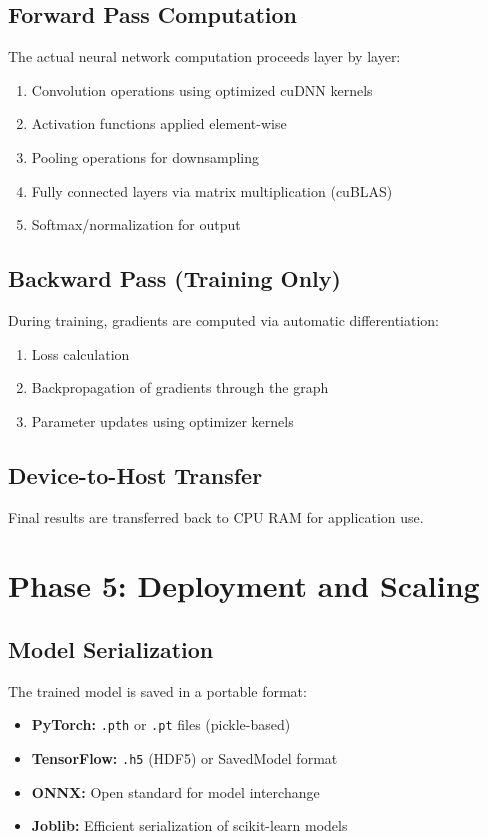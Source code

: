 \documentclass[11pt]{article}
\begin{document}
\subsection{Forward Pass Computation}
The actual neural network computation proceeds layer by layer:
\begin{enumerate}
    \item Convolution operations using optimized cuDNN kernels
    \item Activation functions applied element-wise
    \item Pooling operations for downsampling
    \item Fully connected layers via matrix multiplication (cuBLAS)
    \item Softmax/normalization for output
\end{enumerate}

\subsection{Backward Pass (Training Only)}
During training, gradients are computed via automatic differentiation:
\begin{enumerate}
    \item Loss calculation
    \item Backpropagation of gradients through the graph
    \item Parameter updates using optimizer kernels
\end{enumerate}

\subsection{Device-to-Host Transfer}
Final results are transferred back to CPU RAM for application use.

\section{Phase 5: Deployment and Scaling}

\subsection{Model Serialization}
The trained model is saved in a portable format:

\begin{itemize}
    \item \textbf{PyTorch:} \texttt{.pth} or \texttt{.pt} files (pickle-based)
    \item \textbf{TensorFlow:} \texttt{.h5} (HDF5) or SavedModel format
    \item \textbf{ONNX:} Open standard for model interchange
    \item \textbf{Joblib:} Efficient serialization of scikit-learn models
\end{itemize}
\end{document}
